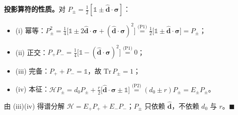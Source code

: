 \documentclass[onecolumn,aps,prl,superscriptaddress,longbibliography]{revtex4-2}
\begin{document}
\textbf{投影算符的性质。}对 $P_\pm = \frac{1}{2}[\mathbb{1} \pm \hat{\mathbf{d}}\cdot\symbf{\sigma}]$：
\begin{itemize}
\item (i) 幂等：$P_\pm^2 = \frac{1}{4}\big[\mathbb{1} \pm 2\hat{\mathbf{d}}\cdot\symbf{\sigma} + (\hat{\mathbf{d}}\cdot\symbf{\sigma})^2\big] \stackrel{\text{(P1)}}{=} \frac{1}{2}\big[\mathbb{1} \pm \hat{\mathbf{d}}\cdot\symbf{\sigma}\big] = P_\pm$；
\item (ii) 正交：$P_+P_- = \frac{1}{4}\big[\mathbb{1} - (\hat{\mathbf{d}}\cdot\symbf{\sigma})^2\big] \stackrel{\text{(P1)}}{=} 0$；
\item (iii) 完备：$P_+ + P_- = \mathbb{1}$，故 $\mathrm{Tr}\,P_\pm = 1$；
\item (iv) 本征：$\mathcal{H}P_\pm = d_0P_\pm + \frac{r}{2}\big[\hat{\mathbf{d}}\cdot\symbf{\sigma} \pm \mathbb{1}\big] \stackrel{\text{(P2)}}{=} (d_0 \pm r)P_\pm = E_\pm P_\pm$。
\end{itemize}
由 (iii)(iv) 得谱分解 $\mathcal{H} = E_+P_+ + E_-P_-$；$P_\pm$ 只依赖 $\hat{\mathbf{d}}$，不依赖 $d_0$ 与 $r$。$\blacksquare$
\end{document}
